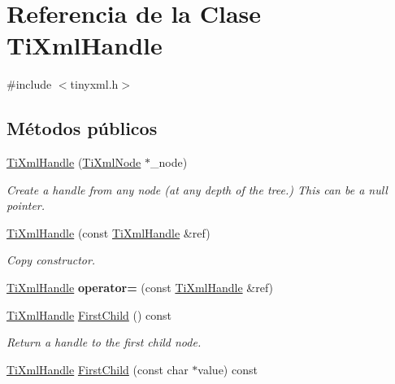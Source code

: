 \hypertarget{classTiXmlHandle}{\section{\-Referencia de la \-Clase \-Ti\-Xml\-Handle}
\label{classTiXmlHandle}
}


{\ttfamily \#include $<$tinyxml.\-h$>$}

\subsection*{\-Métodos públicos}
\begin{DoxyCompactItemize}
\item 
\hypertarget{classTiXmlHandle_aba18fd7bdefb942ecdea4bf4b8e29ec8}{\hyperlink{classTiXmlHandle_aba18fd7bdefb942ecdea4bf4b8e29ec8}{\-Ti\-Xml\-Handle} (\hyperlink{classTiXmlNode}{\-Ti\-Xml\-Node} $\ast$\-\_\-node)}\label{classTiXmlHandle_aba18fd7bdefb942ecdea4bf4b8e29ec8}

\begin{DoxyCompactList}\small\item\em \-Create a handle from any node (at any depth of the tree.) \-This can be a null pointer. \end{DoxyCompactList}\item 
\hypertarget{classTiXmlHandle_a236d7855e1e56ccc7b980630c48c7fd7}{\hyperlink{classTiXmlHandle_a236d7855e1e56ccc7b980630c48c7fd7}{\-Ti\-Xml\-Handle} (const \hyperlink{classTiXmlHandle}{\-Ti\-Xml\-Handle} \&ref)}\label{classTiXmlHandle_a236d7855e1e56ccc7b980630c48c7fd7}

\begin{DoxyCompactList}\small\item\em \-Copy constructor. \end{DoxyCompactList}\item 
\hypertarget{classTiXmlHandle_ad8e5dcf6a87882674203157f29f8e4db}{\hyperlink{classTiXmlHandle}{\-Ti\-Xml\-Handle} {\bfseries operator=} (const \hyperlink{classTiXmlHandle}{\-Ti\-Xml\-Handle} \&ref)}\label{classTiXmlHandle_ad8e5dcf6a87882674203157f29f8e4db}

\item 
\hypertarget{classTiXmlHandle_acdb1faaf88a700b40ca2c8d9aee21139}{\hyperlink{classTiXmlHandle}{\-Ti\-Xml\-Handle} \hyperlink{classTiXmlHandle_acdb1faaf88a700b40ca2c8d9aee21139}{\-First\-Child} () const }\label{classTiXmlHandle_acdb1faaf88a700b40ca2c8d9aee21139}

\begin{DoxyCompactList}\small\item\em \-Return a handle to the first child node. \end{DoxyCompactList}\item 
\hypertarget{classTiXmlHandle_a8c61f64ae9365d89c264f289085541f8}{\hyperlink{classTiXmlHandle}{\-Ti\-Xml\-Handle} \hyperlink{classTiXmlHandle_a8c61f64ae9365d89c264f289085541f8}{\-First\-Child} (const char $\ast$value) const }\label{classTiXmlHandle_a8c61f64ae9365d89c264f289085541f8}


\end{DoxyCompactItemize}
